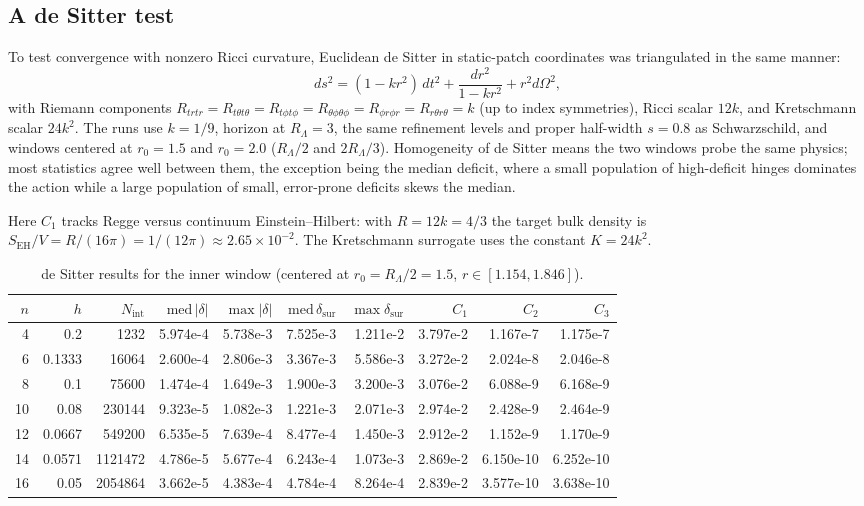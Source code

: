 \documentclass[11pt,letterpaper]{article}
\begin{document}
\subsection{A de Sitter test}
\label{sec:desitter}

To test convergence with nonzero Ricci curvature, Euclidean de Sitter in static-patch coordinates was triangulated in the same manner:
\begin{equation}
ds^{2}=(1-kr^{2})\,dt^{2}+\frac{dr^{2}}{1-kr^{2}}+r^{2}d\Omega^{2},
\label{eq:desitter}
\end{equation}
with Riemann components $R_{trtr}=R_{t\theta t\theta}=R_{t\phi t\phi}=R_{\theta\phi\theta\phi}=R_{\phi r\phi r}=R_{r\theta r\theta}=k$ (up to index symmetries), Ricci scalar $12k$, and Kretschmann scalar $24k^{2}$. The runs use $k=1/9$, horizon at $R_{\Lambda}=3$, the same refinement levels and proper half-width $s=0.8$ as Schwarzschild, and windows centered at $r_{0}=1.5$ and $r_{0}=2.0$ ($R_{\Lambda}/2$ and $2R_{\Lambda}/3$). Homogeneity of de Sitter means the two windows probe the same physics; most statistics agree well between them, the exception being the median deficit, where a small population of high-deficit hinges dominates the action while a large population of small, error-prone deficits skews the median.

Here $C_{1}$ tracks Regge versus continuum Einstein--Hilbert: with $R=12k=4/3$ the target bulk density is $S_{\mathrm{EH}}/V=R/(16\pi)=1/(12\pi)\approx 2.65\times10^{-2}$. The Kretschmann surrogate uses the constant $K=24k^{2}$.

\begin{table}[ht]\centering\small
\begin{tabular}{rrrrrrrrrr}
\toprule
$n$ & $h$ & $N_{\mathrm{int}}$ & $\mathrm{med}\,|\delta|$ & $\max|\delta|$ & $\mathrm{med}\,\delta_{\mathrm{sur}}$ & $\max\delta_{\mathrm{sur}}$ & $C_{1}$ & $C_{2}$ & $C_{3}$\\
\midrule
4 & 0.2 & 1232 & 5.974e-4 & 5.738e-3 & 7.525e-3 & 1.211e-2 & 3.797e-2 & 1.167e-7 & 1.175e-7\\
6 & 0.1333 & 16064 & 2.600e-4 & 2.806e-3 & 3.367e-3 & 5.586e-3 & 3.272e-2 & 2.024e-8 & 2.046e-8\\
8 & 0.1 & 75600 & 1.474e-4 & 1.649e-3 & 1.900e-3 & 3.200e-3 & 3.076e-2 & 6.088e-9 & 6.168e-9\\
10 & 0.08 & 230144 & 9.323e-5 & 1.082e-3 & 1.221e-3 & 2.071e-3 & 2.974e-2 & 2.428e-9 & 2.464e-9\\
12 & 0.0667 & 549200 & 6.535e-5 & 7.639e-4 & 8.477e-4 & 1.450e-3 & 2.912e-2 & 1.152e-9 & 1.170e-9\\
14 & 0.0571 & 1121472 & 4.786e-5 & 5.677e-4 & 6.243e-4 & 1.073e-3 & 2.869e-2 & 6.150e-10 & 6.252e-10\\
16 & 0.05 & 2054864 & 3.662e-5 & 4.383e-4 & 4.784e-4 & 8.264e-4 & 2.839e-2 & 3.577e-10 & 3.638e-10\\
\bottomrule
\end{tabular}
\caption{de Sitter results for the inner window (centered at $r_{0}=R_{\Lambda}/2=1.5$, $r\in[1.154,1.846]$).}
\label{tab:dsinner}
\end{table}
\end{document}
